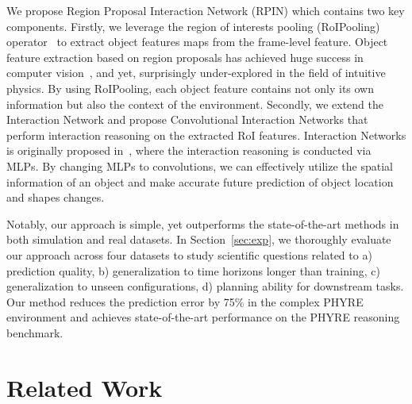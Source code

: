 \documentclass{article} \usepackage{iclr2021_conference,times}
\begin{document}
We propose Region Proposal Interaction Network (RPIN) which contains two key components. Firstly, we leverage the region of interests pooling (RoIPooling) operator~\citep{girshick2015fast} to extract object features maps from the frame-level feature. Object feature extraction based on region proposals has achieved huge success in computer vision~\citep{girshick2015fast,he2017mask,dai2017deformable,gkioxari2019mesh}, and yet, surprisingly under-explored in the field of intuitive physics. By using RoIPooling, each object feature contains not only its own information but also the context of the environment. Secondly, we extend the Interaction Network and propose Convolutional Interaction Networks that perform interaction reasoning on the extracted RoI features. Interaction Networks is originally proposed in~\citep{battaglia2016interaction}, where the interaction reasoning is conducted via MLPs. By changing MLPs to convolutions, we can effectively utilize the spatial information of an object and make accurate future prediction of object location and shapes changes.

Notably, our approach is simple, yet outperforms the state-of-the-art methods in both simulation and real datasets. In Section~\ref{sec:exp}, we thoroughly evaluate our approach across four datasets to study scientific questions related to a) prediction quality, b) generalization to time horizons longer than training, c) generalization to unseen configurations, d) planning ability for downstream tasks. Our method reduces the prediction error by 75\% in the complex PHYRE environment and achieves state-of-the-art performance on the PHYRE reasoning benchmark.

\vspace{-1.0em}
\section{Related Work}
\end{document}
